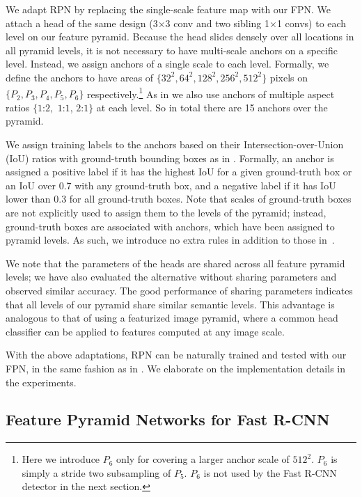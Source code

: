 \documentclass[10pt,twocolumn,letterpaper]{article}
\begin{document}
We adapt RPN by replacing the single-scale feature map with our FPN.
We attach a head of the same design (3$\times$3 conv and two sibling 1$\times$1 convs) to each level on our feature pyramid.
Because the head slides densely over all locations in all pyramid levels, it is not necessary to have multi-scale anchors on a specific level.
Instead, we assign anchors of a single scale to each level.
Formally, we define the anchors to have areas of $\{32^2, 64^2, 128^2, 256^2, 512^2\}$ pixels on $\{P_2, P_3, P_4, P_5, P_6\}$ respectively.\footnote{Here we introduce $P_6$ only for covering a larger anchor scale of $512^2$. 
$P_6$ is simply a stride two subsampling of $P_5$. $P_6$ is not used by the Fast R-CNN detector in the next section.}
As in \cite{Ren2015a} we also use anchors of multiple aspect ratios $\{1$:$2,$ $1$:$1$, $2$:$1\}$ at each level.
So in total there are 15 anchors over the pyramid.

We assign training labels to the anchors based on their Intersection-over-Union (IoU) ratios with ground-truth bounding boxes as in \cite{Ren2015a}.
Formally, an anchor is assigned a positive label if it has the highest IoU for a given ground-truth box or an IoU over 0.7 with any ground-truth box, and a negative label if it has IoU lower than 0.3 for all ground-truth boxes.
Note that scales of ground-truth boxes are not explicitly used to assign them to the levels of the pyramid; instead, ground-truth boxes are associated with anchors, which have been assigned to pyramid levels. As such, we introduce no extra rules in addition to those in~\cite{Ren2015a}.

We note that the parameters of the heads are shared across all feature pyramid levels;
we have also evaluated the alternative without sharing parameters and observed similar accuracy.
The good performance of sharing parameters indicates that all levels of our pyramid share similar semantic levels.
This advantage is analogous to that of using a featurized image pyramid, where a common head classifier can be applied to features computed at any image scale.

With the above adaptations, RPN can be naturally trained and tested with our FPN, in the same fashion as in \cite{Ren2015a}. We elaborate on the implementation details in the experiments.

\subsection{Feature Pyramid Networks for Fast R-CNN}
\end{document}
